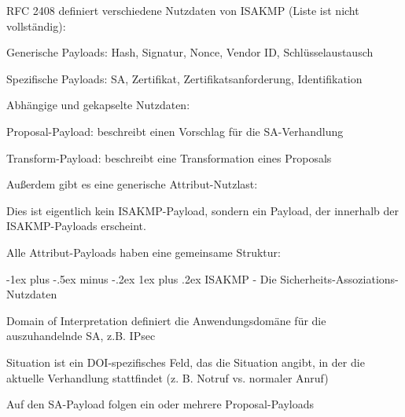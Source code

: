 \documentclass[a4paper]{article}
\makeatletter
\renewcommand{\subsubsection}{\@startsection{subsubsection}{3}{0mm}%
 {-1ex plus -.5ex minus -.2ex}%
 {1ex plus .2ex}%
 {\normalfont\small\bfseries}}
\makeatother
\begin{document}
\begin{multicols}{3}
      \begin{itemize*}
            \item RFC 2408 definiert verschiedene Nutzdaten von ISAKMP (Liste ist nicht
            vollständig):
            \begin{itemize*}
                  \item Generische Payloads: Hash, Signatur, Nonce, Vendor ID, Schlüsselaustausch
                  \item Spezifische Payloads: SA, Zertifikat, Zertifikatsanforderung, Identifikation
                  \item Abhängige und gekapselte Nutzdaten:
                  \begin{itemize*} \item Proposal-Payload: beschreibt einen Vorschlag für die SA-Verhandlung \item Transform-Payload: beschreibt eine Transformation eines Proposals \end{itemize*}
                  \item Außerdem gibt es eine generische Attribut-Nutzlast:
                  \begin{itemize*} \item Dies ist eigentlich kein ISAKMP-Payload, sondern ein Payload, der innerhalb der ISAKMP-Payloads erscheint. \item Alle Attribut-Payloads haben eine gemeinsame Struktur: %
                  \end{itemize*}
            \end{itemize*}

            \subsubsection{ISAKMP - Die
                  Sicherheits-Assoziations-Nutzdaten}
            \begin{itemize*}
                  \item Domain of Interpretation definiert die Anwendungsdomäne für die
                  auszuhandelnde SA, z.B. IPsec
                  \item Situation ist ein DOI-spezifisches Feld, das die Situation angibt, in
                  der die aktuelle Verhandlung stattfindet (z. B. Notruf vs. normaler
                  Anruf)
                  \item Auf den SA-Payload folgen ein oder mehrere Proposal-Payloads
            \end{itemize*}


\end{itemize*}
\end{multicols}
\end{document}
